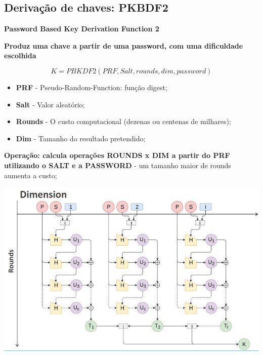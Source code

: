 \documentclass{article}
\begin{document}
\pagebreak

\subsection{Derivação de chaves: PKBDF2}

\begin{flushleft}
  \textbf{Password Based Key Derivation Function 2}

  \vspace{2mm}

  \textbf{Produz uma chave a partir de uma password, com uma dificuldade escolhida}

  \[ K = PBKDF2(PRF, Salt, rounds, dim, password) \]

  \begin{itemize}
    \item \textbf{PRF} - Pseudo-Random-Function: função digest;
    \item \textbf{Salt} - Valor aleatório;
    \item \textbf{Rounds} - O custo computacional (dezenas ou centenas de milhares);
    \item \textbf{Dim} - Tamanho do resultado pretendido;
  \end{itemize}

  \vspace{2mm}

  \textbf{Operação: calcula operações ROUNDS x DIM a partir do PRF utilizando
  o SALT e a PASSWORD} - um tamanho maior de rounds aumenta a custo;
\end{flushleft}

\begin{center}
  \includegraphics[scale=0.3]{14}
\end{center}
\end{document}
